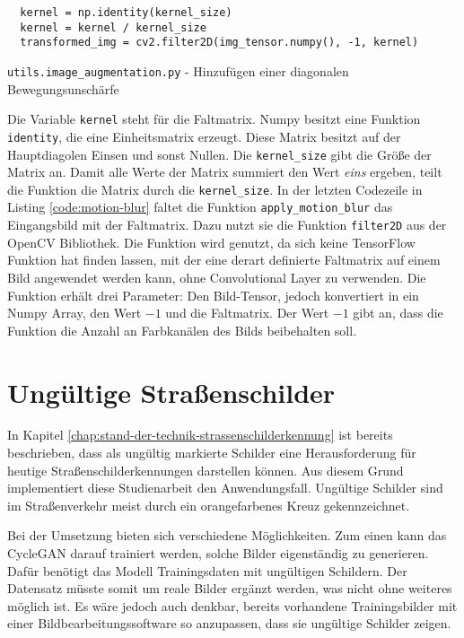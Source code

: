 \begin{code}
  \begin{verbatim}
  kernel = np.identity(kernel_size)
  kernel = kernel / kernel_size
  transformed_img = cv2.filter2D(img_tensor.numpy(), -1, kernel)
  \end{verbatim}
  \caption{\lstinline[language=python]{utils.image_augmentation.py} - Hinzufügen einer diagonalen Bewegungsunschärfe}
  \label{code:motion-blur}
\end{code}

Die Variable \texttt{kernel} steht für die Faltmatrix. Numpy besitzt eine Funktion \texttt{identity}, die eine Einheitsmatrix erzeugt. Diese Matrix besitzt auf der Hauptdiagolen Einsen und sonst Nullen. Die \texttt{kernel_size} gibt die Größe der Matrix an. Damit alle Werte der Matrix summiert den Wert \emph{eins} ergeben, teilt die Funktion die Matrix durch die \texttt{kernel_size}. In der letzten Codezeile in Listing \ref{code:motion-blur} faltet die Funktion \texttt{apply_motion_blur} das Eingangsbild mit der Faltmatrix. Dazu nutzt sie die Funktion \texttt{filter2D} aus der OpenCV Bibliothek. Die Funktion wird genutzt, da sich keine TensorFlow Funktion hat finden lassen, mit der eine derart definierte Faltmatrix auf einem Bild angewendet werden kann, ohne Convolutional Layer zu verwenden. Die Funktion erhält drei Parameter: Den Bild-Tensor, jedoch konvertiert in ein Numpy Array, den Wert $-1$ und die Faltmatrix. Der Wert $-1$ gibt an, dass die Funktion die Anzahl an Farbkanälen des Bilds beibehalten soll.

\section{Ungültige Straßenschilder}
In Kapitel \ref{chap:stand-der-technik-strassenschilderkennung} ist bereits beschrieben, dass als ungültig markierte Schilder eine Herausforderung für heutige Straßenschilderkennungen darstellen können. Aus diesem Grund implementiert diese Studienarbeit den Anwendungsfall. Ungültige Schilder sind im Straßenverkehr meist durch ein orangefarbenes Kreuz gekennzeichnet.

Bei der Umsetzung bieten sich verschiedene Möglichkeiten. Zum einen kann das \ac{CycleGAN} darauf trainiert werden, solche Bilder eigenständig zu generieren. Dafür benötigt das Modell Trainingsdaten mit ungültigen Schildern. Der Datensatz müsste somit um reale Bilder ergänzt werden, was nicht ohne weiteres möglich ist. Es wäre jedoch auch denkbar, bereits vorhandene Trainingsbilder mit einer Bildbearbeitungssoftware so anzupassen, dass sie ungültige Schilder zeigen.

